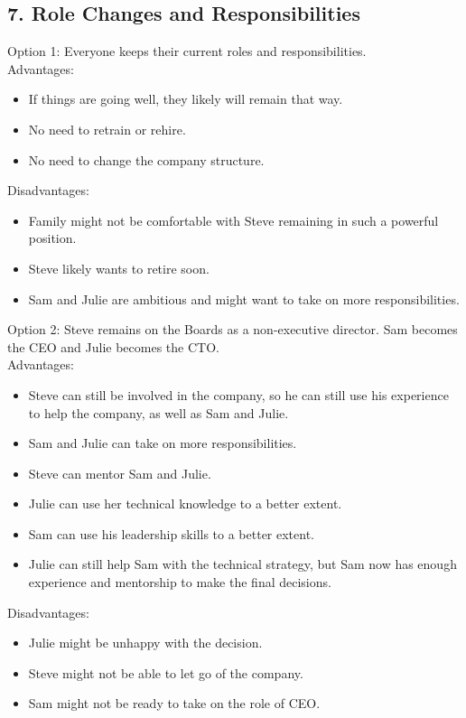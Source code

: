\documentclass[a4paper,10pt]{article}
\begin{document}
\subsection{7. Role Changes and Responsibilities}

Option 1: Everyone keeps their current roles and responsibilities.\\

Advantages:\\
\begin{itemize}
    \item If things are going well, they likely will remain that way.
    \item No need to retrain or rehire.
    \item No need to change the company structure.
\end{itemize}

Disadvantages:\\
\begin{itemize}
    \item Family might not be comfortable with Steve remaining in such a powerful position.
    \item Steve likely wants to retire soon.
    \item Sam and Julie are ambitious and might want to take on more responsibilities.
\end{itemize}

Option 2: Steve remains on the Boards as a non-executive director. Sam becomes the CEO and Julie becomes the CTO.\\

Advantages:\\
\begin{itemize}
    \item Steve can still be involved in the company, so he can still use his experience to help the company, as well as Sam and Julie.
    \item Sam and Julie can take on more responsibilities.
    \item Steve can mentor Sam and Julie.
    \item Julie can use her technical knowledge to a better extent.
    \item Sam can use his leadership skills to a better extent.
    \item Julie can still help Sam with the technical strategy, but Sam now has enough experience and mentorship to make the final decisions.
\end{itemize}

Disadvantages:\\
\begin{itemize}
    \item Julie might be unhappy with the decision.
    \item Steve might not be able to let go of the company.
    \item Sam might not be ready to take on the role of CEO.
\end{itemize}
\end{document}
